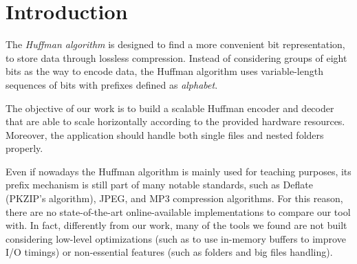 \section{Introduction}
The \emph{Huffman algorithm} is designed to find a more convenient bit representation, to store data through lossless compression. Instead of considering groups of eight bits as the way to encode data, the Huffman algorithm uses variable-length sequences of bits with prefixes defined as \emph{alphabet}.

The objective of our work is to build a scalable Huffman encoder and decoder that are able to scale horizontally according to the provided hardware resources. Moreover, the application should handle both single files and nested folders properly.

Even if nowadays the Huffman algorithm is mainly used for teaching purposes, its prefix mechanism is still part of many notable standards, such as Deflate (PKZIP's algorithm), JPEG, and MP3 compression algorithms. For this reason, there are no state-of-the-art online-available implementations to compare our tool with. In fact, differently from our work, many of the tools we found are not built considering low-level optimizations (such as to use in-memory buffers to improve I/O timings) or non-essential features (such as folders and big files handling).

